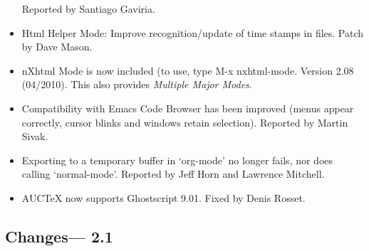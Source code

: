 \begin{itemize}
Reported by Santiago Gaviria.
\item Html Helper Mode: Improve recognition/update of time stamps in files.
Patch by Dave Mason.
\item nXhtml Mode is now included (to use, type M-x nxhtml-mode.  Version 2.08 (04/2010).  This also provides \emph{Multiple Major Modes}.
\item Compatibility with Emacs Code Browser has been improved (menus appear correctly, cursor blinks and windows retain selection).
Reported by Martin Sivak.
\item Exporting to a temporary buffer in `org-mode' no longer fails, nor does calling `normal-mode'.
Reported by Jeff Horn and Lawrence Mitchell.
\item AUCTeX now supports Ghostscript 9.01.
Fixed by Denis Rosset.

\end{itemize}

\subsection{Changes--- 2.1}


